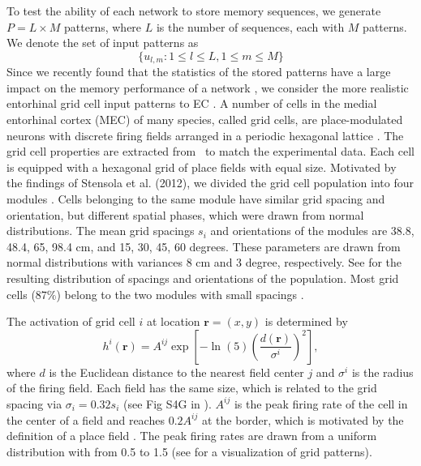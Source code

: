 \documentclass[utf8]{frontiersSCNS} %
\begin{document}
To test the ability of each network to store memory sequences, we generate $P = L \times M$ patterns, where $L$ is the number of sequences, each with $M$ patterns. We denote the set of input patterns as 
\begin{equation}
	\{ u_{l,m}: 1\le l \le L, 1\le m \le M \}
\end{equation}
Since we recently found that the statistics of the stored patterns have a large impact on the memory performance of a network \citep{neher2015memory}, we consider the more realistic entorhinal grid cell input patterns to EC \citep{hafting2005microstructure}. 
%
A number of cells in the medial entorhinal cortex (MEC) of many species, called grid cells, are place-modulated neurons with discrete firing fields arranged in a periodic hexagonal lattice \citep{hafting2005microstructure}.  
%
The grid cell properties are extracted from~\citep{stensola2012entorhinal} to match the experimental data.
Each cell is equipped with a hexagonal grid of place fields with equal size.
%
Motivated by the findings of Stensola et al. (2012), we divided the grid cell population into four modules \citep{stensola2012entorhinal}. Cells belonging to the same module have similar grid spacing and orientation, but different spatial phases, which were drawn from normal distributions. 
%
The mean grid spacings $s_i$ and orientations of the modules are 38.8, 48.4, 65, 98.4 cm, and 15, 30, 45, 60 degrees. These parameters are drawn from normal distributions with variances 8 cm and 3 degree, respectively.
%
See \citep[Fig 1B-1C]{neher2015memory} for the resulting distribution of spacings and orientations of the population.
%
Most grid cells ($87\%$) belong to the two modules with small spacings \citep{stensola2012entorhinal}. 

The activation of grid cell $i$ at location $\mathbf{r}=(x,y)$ is determined by
\begin{equation}
\label{eq:grid}
h^i(\mathbf{r}) = A^{ij} \exp \left[ -\ln(5) \left(\frac{d(\mathbf{r})}{\sigma^i}\right)^2 \right],
\end{equation}
where $d$ is the Euclidean distance to the nearest field center $j$ and $\sigma^i$ is the radius of the firing field.
%
Each field has the same size, which is related to the grid spacing via $ \sigma_i  = 0.32 s_i $ (see Fig
S4G in \citep{hafting2005microstructure}). 
%
$A^{ij}$ is the peak firing rate of the cell in the center of a field and reaches $0.2 A^{ij}$ at the border, which is motivated by the definition of a place field \citep{hafting2005microstructure}. The peak firing rates are drawn from a uniform distribution with from 0.5 to 1.5 (see \citep{neher2015memory} for a visualization of grid patterns).  
%
\end{document}
